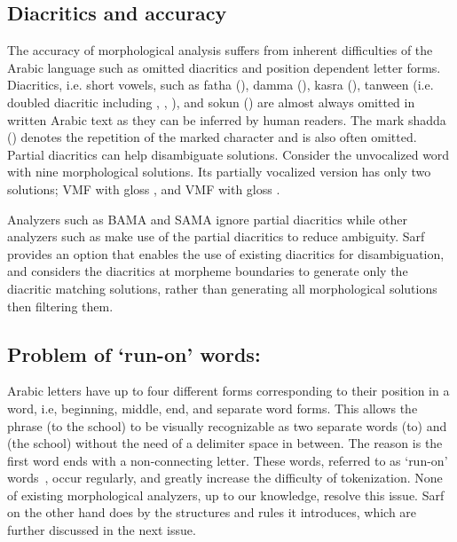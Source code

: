 \subsection{Diacritics and accuracy}

The accuracy of morphological analysis %
suffers from inherent difficulties
of the Arabic language such as omitted diacritics and position dependent letter
forms. 
%
\fullvocalize
Diacritics, i.e. short vowels, such as 
fatha (), damma (), kasra (), 
tanween (i.e. doubled diacritic including , , ), 
\transfalse and sokun () 
are almost always omitted in written Arabic text as they can be 
inferred by human readers.
The mark \novocalize shadda () \transtrue denotes the repetition
of the marked character and is also often omitted. 
Partial diacritics can help disambiguate solutions. 
Consider the unvocalized word  with nine morphological solutions.  
Its partially vocalized version  has only two solutions; 
VMF  with gloss , and 
VMF  with gloss .

Analyzers such as BAMA and SAMA ignore partial diacritics while 
other analyzers such as \citep*{Beesley:01,Chaaben:10,Attia:00} make use of 
the partial diacritics to reduce ambiguity. 
Sarf provides an option that enables the use of existing diacritics for disambiguation, 
and considers the diacritics at morpheme boundaries to generate only the diacritic 
matching solutions, rather than generating all morphological solutions then 
filtering them. 


\subsection{Problem of `run-on' words:}

Arabic letters have up to four different forms
corresponding to their position in a word, i.e, beginning,
middle, end, and separate word forms. 
This allows the phrase \transfalse
{} \transtrue {} (to the school)
to be visually recognizable
as two separate words  (to) and  (the school) 
without the need of a delimiter space in between. 
The reason is the first word  ends with
 a non-connecting letter. 
These words, referred to as `run-on' words~\citep*{Buckwalter:04},
occur regularly, and greatly increase the
difficulty of tokenization. 
None of existing morphological analyzers, up to our knowledge, 
resolve this issue. Sarf on the other hand does by the structures and rules it introduces, which are further discussed in the next issue.

